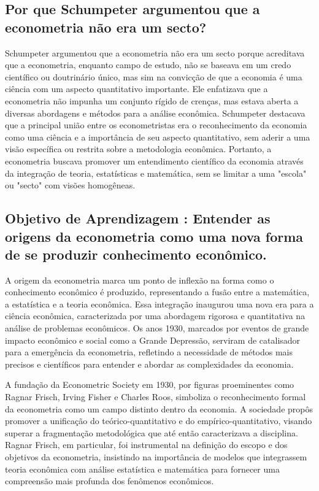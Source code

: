 \documentclass[a4paper,12pt]{article}[abntex2]
\begin{document}
\subsection{\textbf{Por que Schumpeter argumentou que a econometria não era um secto?}}
Schumpeter argumentou que a econometria não era um secto porque acreditava que a econometria, enquanto campo de estudo, não se baseava em um credo científico ou doutrinário único, mas sim na convicção de que a economia é uma ciência com um aspecto quantitativo importante. Ele enfatizava que a econometria não impunha um conjunto rígido de crenças, mas estava aberta a diversas abordagens e métodos para a análise econômica. Schumpeter destacava que a principal união entre os econometristas era o reconhecimento da economia como uma ciência e a importância de seu aspecto quantitativo, sem aderir a uma visão específica ou restrita sobre a metodologia econômica. Portanto, a econometria buscava promover um entendimento científico da economia através da integração de teoria, estatísticas e matemática, sem se limitar a uma "escola" ou "secto" com visões homogêneas.

\subsection{\textbf{Objetivo de Aprendizagem : Entender as origens da econometria como uma nova forma de se produzir conhecimento econômico.}}
A origem da econometria marca um ponto de inflexão na forma como o conhecimento econômico é produzido, representando a fusão entre a matemática, a estatística e a teoria econômica. Essa integração inaugurou uma nova era para a ciência econômica, caracterizada por uma abordagem rigorosa e quantitativa na análise de problemas econômicos. Os anos 1930, marcados por eventos de grande impacto econômico e social como a Grande Depressão, serviram de catalisador para a emergência da econometria, refletindo a necessidade de métodos mais precisos e científicos para entender e abordar as complexidades da economia.

A fundação da Econometric Society em 1930, por figuras proeminentes como Ragnar Frisch, Irving Fisher e Charles Roos, simboliza o reconhecimento formal da econometria como um campo distinto dentro da economia. A sociedade propôs promover a unificação do teórico-quantitativo e do empírico-quantitativo, visando superar a fragmentação metodológica que até então caracterizava a disciplina. Ragnar Frisch, em particular, foi instrumental na definição do escopo e dos objetivos da econometria, insistindo na importância de modelos que integrassem teoria econômica com análise estatística e matemática para fornecer uma compreensão mais profunda dos fenômenos econômicos.
\end{document}
